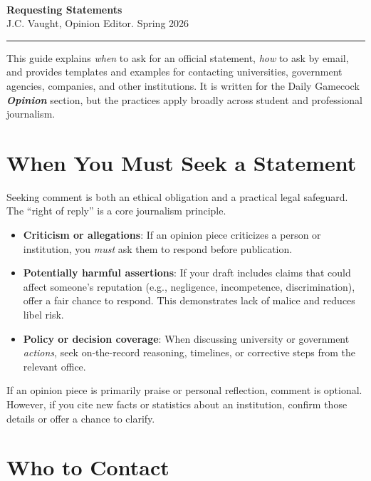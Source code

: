 \documentclass[12pt]{article}
\newcommand{\doctitle}{%
    \noindent{\LARGE\bfseries Daily Gamecock \textit{Opinion}}\\[2pt]
    {\LARGE\bfseries Requesting Statements}\\[4pt]
    {\normalsize J.C. Vaught, Opinion Editor. Spring 2026}\\[-2pt]
    \noindent\rule{\textwidth}{1pt}
    \vspace{8pt}
}
\newcommand{\key}[1]{\textbf{#1}}
\begin{document}
\thispagestyle{plain}

\doctitle

\begin{principalbox}
This guide explains \emph{when} to ask for an official statement, \emph{how} to ask by email, and provides templates and examples for contacting universities, government agencies, companies, and other institutions. It is written for the Daily Gamecock \textit{\textbf{Opinion}} section, but the practices apply broadly across student and professional journalism.
\end{principalbox}

\section{When You Must Seek a Statement}

Seeking comment is both an ethical obligation and a practical legal safeguard. The ``right of reply'' is a core journalism principle.

\begin{exampleblock}
\begin{itemize}
  \item \key{Criticism or allegations}: If an opinion piece criticizes a person or institution, you \emph{must} ask them to respond before publication.
  \item \key{Potentially harmful assertions}: If your draft includes claims that could affect someone's reputation (e.g., negligence, incompetence, discrimination), offer a fair chance to respond. This demonstrates lack of malice and reduces libel risk.
  \item \key{Policy or decision coverage}: When discussing university or government \emph{actions}, seek on-the-record reasoning, timelines, or corrective steps from the relevant office.
\end{itemize}
\end{exampleblock}

\begin{exampleblock}
If an opinion piece is primarily praise or personal reflection, comment is optional. However, if you cite new facts or statistics about an institution, confirm those details or offer a chance to clarify.
\end{exampleblock}

\section{Who to Contact}
\end{document}
